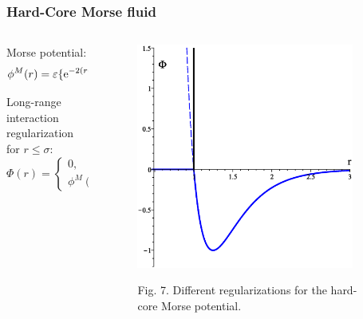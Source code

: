 \documentclass[8pt]{beamer}
\begin{document}
	\begin{frame}
		\frametitle{Hard-Core Morse fluid}
		
		\begin{columns}
			\begin{column}{0.5\textwidth}
				Morse potential:
				\begin{equation*}
					\phi^M(r) = \varepsilon \{{\rm e}^{-2(r-R_0)/\alpha}-2{\rm e}^{-(r-R_0)/\alpha}\}.
				\end{equation*}
				
				Long-range interaction regularization for $r \leq \sigma$:
				\begin{equation*}
					\Phi(r) = \left\{
					\begin{array}{ll}
						0, & r \leq \sigma 
						\\
						\phi^M(r), & r > \sigma.
					\end{array}
					\right.
				\end{equation*}
								
			\end{column}
			
			\begin{column}{0.5\textwidth}
				\begin{figure}[htbp]
					\includegraphics[width=0.9\textwidth,angle=0]{hcmorse} \\
					\parbox{0.8\textwidth}{\caption*{Fig. 7. Different regularizations for the hard-core Morse potential.
					}}
				\end{figure}
				
			\end{column}
		\end{columns}
		
	\end{frame}
	
\end{document}
